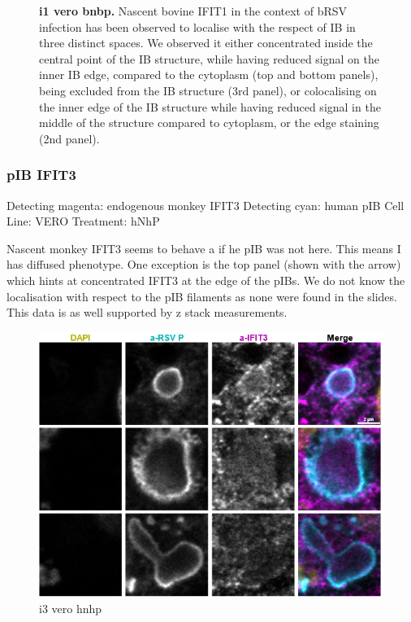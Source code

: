 \begin{figure}
\begin{subfigure}{1\textwidth}
    \end{subfigure}
    \caption[i1 vero bnbp]{\textbf{i1 vero bnbp.} Nascent bovine IFIT1 in the context of bRSV infection has been observed to localise with the respect of IB in three distinct spaces. We observed it either concentrated inside the central point of the IB structure, while having reduced signal on the inner IB edge, compared to the cytoplasm (top and bottom panels), being excluded from the IB structure (3rd panel), or colocalising on the inner edge of the IB structure while having reduced signal in the middle of the structure compared to cytoplasm, or the edge staining (2nd panel).}
    \label{fig:i1 vero bnbp}
\end{figure}

\subsubsection{pIB IFIT3}
Detecting magenta: endogenous monkey IFIT3 \newline
Detecting cyan: human pIB \newline
Cell Line: VERO \newline
Treatment: hNhP \newline

Nascent monkey IFIT3 seems to behave a if he pIB was not here. This means I has diffused phenotype. One exception is the top panel (shown with the arrow) which hints at concentrated IFIT3 at the edge of the pIBs. We do not know the localisation with respect to the pIB filaments as none were found in the slides. This data is as well supported by z stack measurements.

\begin{figure}
    \centering
    \includegraphics[width=1\linewidth]{09. Chapter 4/Figs/03. pIB/04. i3 vero hnhp.png}
    \caption[i3 vero hnhp]{i3 vero hnhp}
    \label{fig:i3 vero hnhp}
\end{figure}

